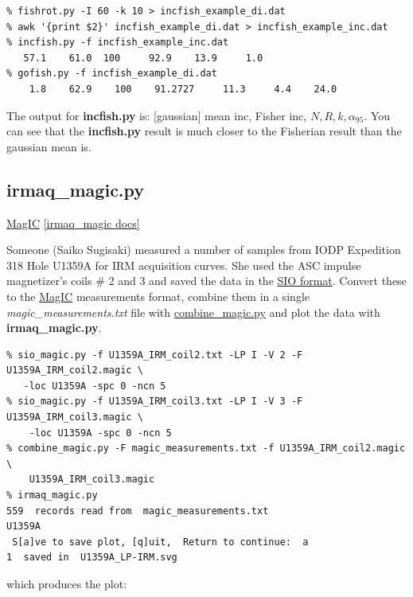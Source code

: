 \documentclass[11pt]{book}
\begin{document}
{{{\begin{verbatim}
% fishrot.py -I 60 -k 10 > incfish_example_di.dat
% awk '{print $2}' incfish_example_di.dat > incfish_example_inc.dat
% incfish.py -f incfish_example_inc.dat 
   57.1    61.0  100     92.9    13.9     1.0
% gofish.py -f incfish_example_di.dat 
    1.8    62.9    100    91.2727     11.3     4.4    24.0
\end{verbatim}

The output for {\bf incfish.py} is:  [gaussian] mean inc, Fisher inc, $N, R, k, \alpha_{95}$.  You can see that the {\bf incfish.py} result is much closer to the Fisherian result than the gaussian mean is. 

\subsection{irmaq\_magic.py}
\href{#MagIC}{MagIC}
\href{http://earthref.org/PmagPy/pmagpydocs/irmaq_magic-module.html}{[irmaq\_magic docs]}

Someone (Saiko Sugisaki) measured a number of samples from IODP Expedition 318 Hole U1359A for IRM acquisition curves.  She used the ASC impulse magnetizer's coils \# 2 and 3 and saved the data in the \href{#sio_magic.py}{SIO format}.   Convert these to the \href{#MagIC}{MagIC} measurements  format, combine them in a  single {\it magic\_measurements.txt} file with \href{#combine_magic.py}{combine\_magic.py} and plot the data with {\bf irmaq\_magic.py}. 

\begin{verbatim}
% sio_magic.py -f U1359A_IRM_coil2.txt -LP I -V 2 -F U1359A_IRM_coil2.magic \
   -loc U1359A -spc 0 -ncn 5
% sio_magic.py -f U1359A_IRM_coil3.txt -LP I -V 3 -F U1359A_IRM_coil3.magic \
    -loc U1359A -spc 0 -ncn 5
% combine_magic.py -F magic_measurements.txt -f U1359A_IRM_coil2.magic \ 
    U1359A_IRM_coil3.magic
% irmaq_magic.py
559  records read from  magic_measurements.txt
U1359A
 S[a]ve to save plot, [q]uit,  Return to continue:  a
1  saved in  U1359A_LP-IRM.svg
\end{verbatim}

which produces the plot:

}}}
\end{document}

